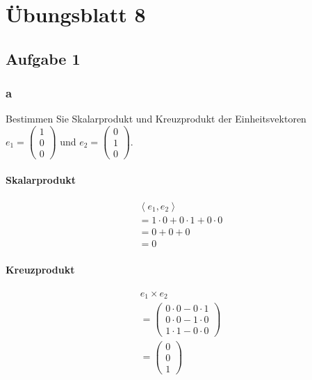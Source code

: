 \chapter{Übungsblatt 8}

\section{Aufgabe 1}

\subsection{a}
Bestimmen Sie Skalarprodukt und Kreuzprodukt der Einheitsvektoren $e_1 = \begin{pmatrix}1 \\ 0 \\ 0\end{pmatrix}$ und $e_2 = \begin{pmatrix}0 \\ 1 \\ 0\end{pmatrix}$.

\subsubsection*{Skalarprodukt}
\begin{align*}
    \left\langle e_1, e_2\right\rangle  \\
    = 1 \cdot 0 + 0 \cdot 1 + 0 \cdot 0 \\
    = 0 + 0 + 0                         \\
    = 0
\end{align*}

\subsubsection*{Kreuzprodukt}
\begin{align*}
    e_1 \times e_2         \\
    =\begin{pmatrix}
         0 \cdot 0 - 0 \cdot 1 \\
         0 \cdot 0 - 1 \cdot 0 \\
         1 \cdot 1 - 0 \cdot 0
     \end{pmatrix} \\
    = \begin{pmatrix}
          0 \\ 0 \\ 1
      \end{pmatrix}
\end{align*}

